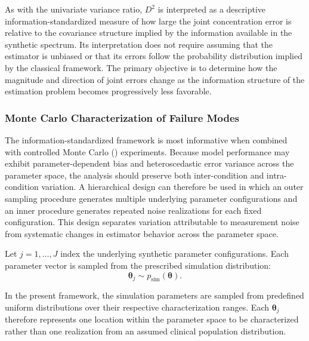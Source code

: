 As with the univariate variance ratio, $D^{2}$ is interpreted as a descriptive information-standardized measure of how large the joint concentration error is relative to the covariance structure implied by the information available in the synthetic spectrum. Its interpretation does not require assuming that the \DL estimator is unbiased or that its errors follow the probability distribution implied by the classical \CRLB framework. The primary objective is to determine how the magnitude and direction of joint errors change as the information structure of the estimation problem becomes progressively less favorable.

\subsubsection{Monte Carlo Characterization of Failure Modes}
\label{sec:Analy&Visual:subsec:infoStand:subsubsec:MC}
The information-standardized framework is most informative when combined with controlled Monte Carlo (\MC) experiments. Because \DL model performance may exhibit parameter-dependent bias and heteroscedastic error variance across the parameter space, the \MC analysis should preserve both inter-condition and intra-condition variation. A hierarchical design can therefore be used in which an outer sampling procedure generates multiple underlying parameter configurations and an inner \MC procedure generates repeated noise realizations for each fixed configuration. This design separates variation attributable to measurement noise from systematic changes in estimator behavior across the parameter space.

Let $j=1,\ldots,J$ index the underlying synthetic parameter configurations. Each parameter vector is sampled from the prescribed simulation distribution:
\begin{equation}
    \boldsymbol{\theta}_j \sim p_{\mathrm{sim}}(\boldsymbol{\theta}).
\end{equation}

In the present framework, the simulation parameters are sampled from predefined uniform distributions over their respective characterization ranges. Each $\boldsymbol{\theta}_j$ therefore represents one location within the parameter space to be characterized rather than one realization from an assumed clinical population distribution.

